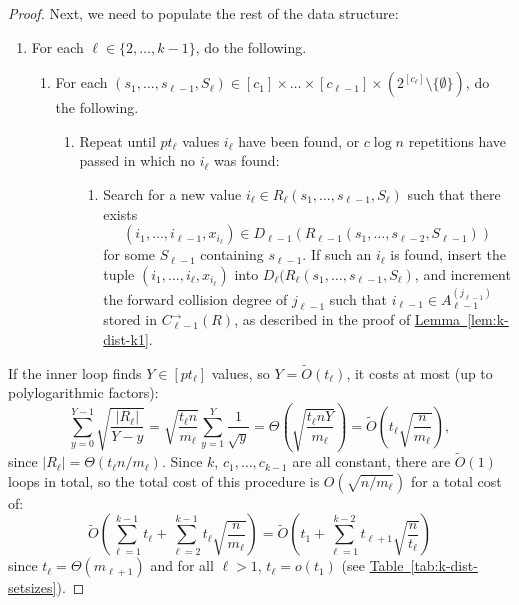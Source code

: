 \documentclass{theoretics}
\newcommand{\lem}[1]{\hyperref[lem:#1]{Lemma~\ref*{lem:#1}}}
\newcommand{\tabl}[1]{\hyperref[tab:#1]{Table~\ref*{tab:#1}}}
\renewcommand{\>}{\rangle}
\newcommand{\<}{\langle}
\renewcommand{\(}{\left(}
\renewcommand{\)}{\right)}
\begin{document}
\begin{proof}
\noindent Next, we need to populate the rest of the data structure:
\begin{enumerate}
	\item[] For each $\ell\in\{2,\dots,k-1\}$, do the following. 
	\begin{enumerate}
		\item[] For each $(s_1,\dots,s_{\ell-1},S_{\ell})\in [c_1]\times\dots\times[c_{\ell-1}]\times (2^{[c_{\ell}]}\setminus\{\emptyset\})$, do the following. 
		\begin{enumerate}
			\item[] Repeat until $p t_{\ell}$ values $i_{\ell}$ have been found, or $c\log n$ repetitions have passed in which no $i_{\ell}$ was found:
			\begin{enumerate}
				\item[] Search for a new value $i_{\ell}\in R_{\ell}(s_1,\dots,s_{\ell-1},S_{\ell})$ such that there exists 
$$(i_1,\dots,i_{\ell-1},x_{i_{\ell}})\in D_{\ell-1}(R_{\ell-1}(s_1,\dots,s_{\ell-2},S_{\ell-1}))$$
 for some $S_{\ell-1}$ containing $s_{\ell-1}$.  If such an $i_{\ell}$ is found, insert the tuple $(i_1,\dots,i_{\ell},x_{i_{\ell}})$ into $D_{\ell}(R_{\ell}(s_1,\dots,s_{\ell-1},S_{\ell})$, and increment the forward collision degree of $j_{\ell-1}$ such that $i_{\ell-1}\in A_{\ell-1}^{(j_{\ell-1})}$ stored in $C^{\rightarrow}_{\ell-1}(R)$, as described in the proof of \lem{k-dist-k1}.
			\end{enumerate}
		\end{enumerate}
	\end{enumerate}
\end{enumerate}
If the inner loop finds $Y\in [pt_{\ell}]$ values, so $Y=\widetilde{O}(t_{\ell})$, it costs at most (up to polylogarithmic factors):
$$\sum_{y=0}^{Y-1}\sqrt{\frac{|R_{\ell}|}{Y-y}} = \sqrt{\frac{t_{\ell}n}{m_{\ell}}}\sum_{y=1}^Y\frac{1}{\sqrt{y}} = \Theta\left(\sqrt{\frac{t_{\ell}n Y}{m_{\ell}}}\right)
=\widetilde{O}\left(t_{\ell}\sqrt{\frac{n }{m_{\ell}}}\right),$$
since $|R_{\ell}|=\Theta(t_{\ell}n/m_{\ell})$.
Since $k$, $c_1,\dots,c_{k-1}$ are all constant, there are $\widetilde{O}(1)$ loops in total, so the total cost of this procedure is
$O(\sqrt{n/m_{\ell}})$
for a total cost of:
$$\widetilde{O}\left(\sum_{\ell=1}^{k-1}t_{\ell}+\sum_{\ell=2}^{k-1}t_{\ell}\sqrt{\frac{n}{m_{\ell}}}\right)=\widetilde{O}\left(t_1+\sum_{\ell=1}^{k-2}t_{\ell+1}\sqrt{\frac{n}{t_{\ell}}}\right)$$
since $t_{\ell}=\Theta(m_{\ell+1})$ and for all $\ell>1$, $t_{\ell}=o(t_1)$ (see \tabl{k-dist-setsizes}).


\end{proof}
\end{document}
